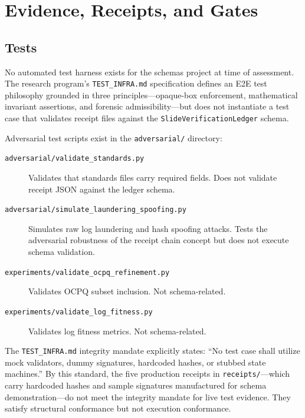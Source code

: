 
\section{Evidence, Receipts, and Gates}
\label{sec:schemas-evidence}

\subsection{Tests}
\label{sec:schemas-evidence-tests}

No automated test harness exists for the schemas project at time of assessment. The research
program's \texttt{TEST\_INFRA.md} specification defines an E2E test philosophy grounded in three
principles---opaque-box enforcement, mathematical invariant assertions, and forensic
admissibility---but does not instantiate a test case that validates receipt files against the
\texttt{SlideVerificationLedger} schema.

Adversarial test scripts exist in the \texttt{adversarial/} directory:

\begin{description}
  \item[\texttt{adversarial/validate\_standards.py}] Validates that standards files carry required
    fields. Does not validate receipt JSON against the ledger schema.
  \item[\texttt{adversarial/simulate\_laundering\_spoofing.py}] Simulates raw log laundering and
    hash spoofing attacks. Tests the adversarial robustness of the receipt chain concept but
    does not execute schema validation.
  \item[\texttt{experiments/validate\_ocpq\_refinement.py}] Validates OCPQ subset inclusion.
    Not schema-related.
  \item[\texttt{experiments/validate\_log\_fitness.py}] Validates log fitness metrics.
    Not schema-related.
\end{description}

The \texttt{TEST\_INFRA.md} integrity mandate explicitly states: ``No test case shall utilize mock
validators, dummy signatures, hardcoded hashes, or stubbed state machines.'' By this standard,
the five production receipts in \texttt{receipts/}---which carry hardcoded hashes and sample
signatures manufactured for schema demonstration---do not meet the integrity mandate for live
test evidence. They satisfy structural conformance but not execution conformance.

